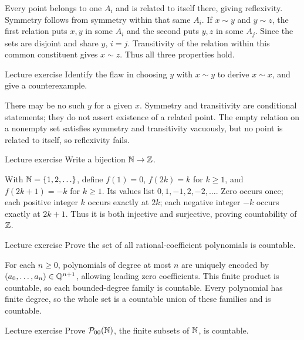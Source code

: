 \begin{answer}
Every point belongs to one $A_i$ and is related to itself there, giving reflexivity. Symmetry follows from symmetry within that same $A_i$. If $x\sim y$ and $y\sim z$, the first relation puts $x,y$ in some $A_i$ and the second puts $y,z$ in some $A_j$. Since the sets are disjoint and share $y$, $i=j$. Transitivity of the relation within this common constituent gives $x\sim z$. Thus all three properties hold.
\end{answer}
\begin{exam}{Lecture exercise}
Identify the flaw in choosing $y$ with $x\sim y$ to derive $x\sim x$, and give a counterexample.
\end{exam}
\begin{answer}
There may be no such $y$ for a given $x$. Symmetry and transitivity are conditional statements; they do not assert existence of a related point. The empty relation on a nonempty set satisfies symmetry and transitivity vacuously, but no point is related to itself, so reflexivity fails.
\end{answer}
\begin{exam}{Lecture exercise}
Write a bijection $\mathbb N\to\mathbb Z$.
\end{exam}
\begin{answer}
With $\mathbb N=\{1,2,\ldots\}$, define $f(1)=0$, $f(2k)=k$ for $k\ge1$, and $f(2k+1)=-k$ for $k\ge1$. Its values list $0,1,-1,2,-2,\ldots$. Zero occurs once; each positive integer $k$ occurs exactly at $2k$; each negative integer $-k$ occurs exactly at $2k+1$. Thus it is both injective and surjective, proving countability of $\mathbb Z$.
\end{answer}
\begin{exam}{Lecture exercise}
Prove the set of all rational-coefficient polynomials is countable.
\end{exam}
\begin{answer}
For each $n\ge0$, polynomials of degree at most $n$ are uniquely encoded by $(a_0,\ldots,a_n)\in\mathbb Q^{n+1}$, allowing leading zero coefficients. This finite product is countable, so each bounded-degree family is countable. Every polynomial has finite degree, so the whole set is a countable union of these families and is countable.
\end{answer}
\begin{exam}{Lecture exercise}
Prove $\mathcal P_{00}(\mathbb N)$, the finite subsets of $\mathbb N$, is countable.
\end{exam}
